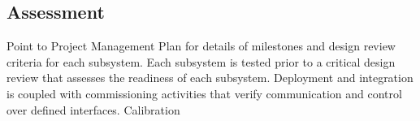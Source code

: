 \documentclass[preprint]{aastex}
\begin{document}

\subsection{Assessment}

Point to Project Management Plan for details of milestones and design review criteria for each subsystem.
Each subsystem is tested prior to a critical design review that assesses the readiness of each subsystem.
Deployment and integration is coupled with commissioning activities that verify communication and control over defined interfaces.
Calibration 


\end{document}
